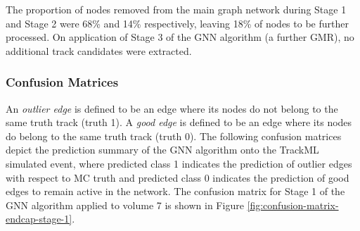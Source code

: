 The proportion of nodes removed from the main graph network during Stage 1 and Stage 2 were 68\% and 14\% respectively, leaving 18\% of nodes to be further processed. On application of Stage 3 of the GNN algorithm (a further GMR), no additional track candidates were extracted.


\subsubsection{Confusion Matrices}
An \textit{outlier edge} is defined to be an edge where its nodes do not belong to the same truth track (truth 1). A \textit{good edge} is defined to be an edge where its nodes do belong to the same truth track (truth 0). The following confusion matrices depict the prediction summary of the GNN algorithm onto the TrackML simulated event, where predicted class 1 indicates the prediction of outlier edges with respect to MC truth and predicted class 0 indicates the prediction of good edges to remain active in the network. The confusion matrix for Stage 1 of the GNN algorithm applied to volume 7 is shown in Figure \ref{fig:confusion-matrix-endcap-stage-1}.

